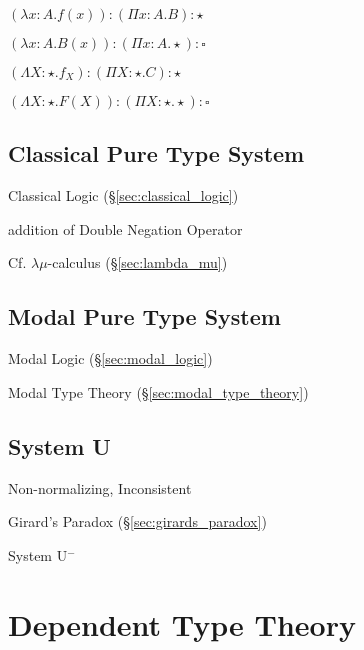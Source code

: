 $(\lambda x:A.f(x)):(\Pi x:A.B):\star$

$(\lambda x:A.B(x)):(\Pi x:A.\star):\square$

$(\Lambda X:\star.f_X):(\Pi X:\star.C):\star$

$(\Lambda X:\star.F(X)):(\Pi X:\star.\star):\square$



\subsection{Classical Pure Type System}\label{sec:cpts}

Classical Logic (\S\ref{sec:classical_logic})

addition of Double Negation Operator

\fist Cf. $\lambda\mu$-calculus (\S\ref{sec:lambda_mu})



\subsection{Modal Pure Type System}\label{sec:mpts}

Modal Logic (\S\ref{sec:modal_logic})

Modal Type Theory (\S\ref{sec:modal_type_theory})



\subsection{System U}\label{sec:system_u}

Non-normalizing, Inconsistent

Girard's Paradox (\S\ref{sec:girards_paradox})

System U$^-$



\section{Dependent Type Theory}\label{sec:dependent_type_theory}

